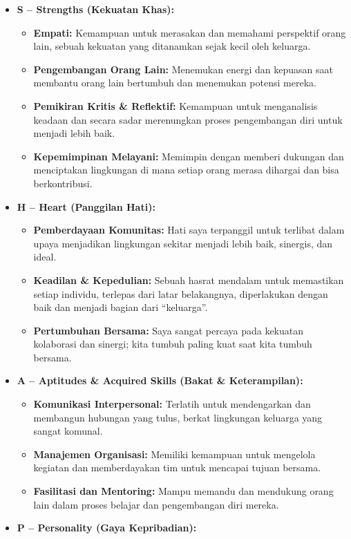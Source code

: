\documentclass[
  letterpaper,
  DIV=11,
  numbers=noendperiod]{scrreprt}
\providecommand{\tightlist}{%
  \setlength{\itemsep}{0pt}\setlength{\parskip}{0pt}}
\begin{document}
\begin{itemize}
\tightlist
\item
  \textbf{S -- Strengths (Kekuatan Khas):}

  \begin{itemize}
  \tightlist
  \item
    \textbf{Empati:} Kemampuan untuk merasakan dan memahami perspektif
    orang lain, sebuah kekuatan yang ditanamkan sejak kecil oleh
    keluarga.
  \item
    \textbf{Pengembangan Orang Lain:} Menemukan energi dan kepuasan saat
    membantu orang lain bertumbuh dan menemukan potensi mereka.
  \item
    \textbf{Pemikiran Kritis \& Reflektif:} Kemampuan untuk menganalisis
    keadaan dan secara sadar merenungkan proses pengembangan diri untuk
    menjadi lebih baik.
  \item
    \textbf{Kepemimpinan Melayani:} Memimpin dengan memberi dukungan dan
    menciptakan lingkungan di mana setiap orang merasa dihargai dan bisa
    berkontribusi.
  \end{itemize}
\item
  \textbf{H -- Heart (Panggilan Hati):}

  \begin{itemize}
  \tightlist
  \item
    \textbf{Pemberdayaan Komunitas:} Hati saya terpanggil untuk terlibat
    dalam upaya menjadikan lingkungan sekitar menjadi lebih baik,
    sinergis, dan ideal.
  \item
    \textbf{Keadilan \& Kepedulian:} Sebuah hasrat mendalam untuk
    memastikan setiap individu, terlepas dari latar belakangnya,
    diperlakukan dengan baik dan menjadi bagian dari ``keluarga''.
  \item
    \textbf{Pertumbuhan Bersama:} Saya sangat percaya pada kekuatan
    kolaborasi dan sinergi; kita tumbuh paling kuat saat kita tumbuh
    bersama.
  \end{itemize}
\item
  \textbf{A -- Aptitudes \& Acquired Skills (Bakat \& Keterampilan):}

  \begin{itemize}
  \tightlist
  \item
    \textbf{Komunikasi Interpersonal:} Terlatih untuk mendengarkan dan
    membangun hubungan yang tulus, berkat lingkungan keluarga yang
    sangat komunal.
  \item
    \textbf{Manajemen Organisasi:} Memiliki kemampuan untuk mengelola
    kegiatan dan memberdayakan tim untuk mencapai tujuan bersama.
  \item
    \textbf{Fasilitasi dan Mentoring:} Mampu memandu dan mendukung orang
    lain dalam proses belajar dan pengembangan diri mereka.
  \end{itemize}
\item
  \textbf{P -- Personality (Gaya Kepribadian):}


\end{itemize}
\end{document}
